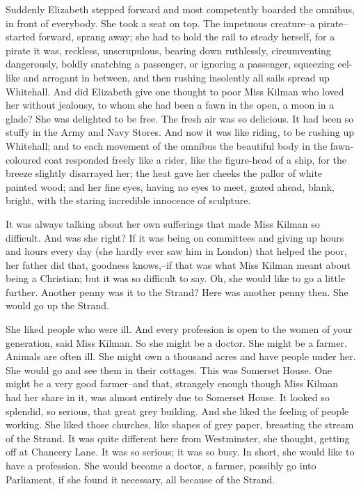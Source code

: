 \documentclass[lang=cn,10pt]{elegantbook}
\begin{document}
Suddenly Elizabeth stepped forward and most competently boarded the
omnibus, in front of everybody.  She took a seat on top.  The
impetuous creature--a pirate--started forward, sprang away; she had
to hold the rail to steady herself, for a pirate it was, reckless,
unscrupulous, bearing down ruthlessly, circumventing dangerously,
boldly snatching a passenger, or ignoring a passenger, squeezing
eel-like and arrogant in between, and then rushing insolently all
sails spread up Whitehall.  And did Elizabeth give one thought to
poor Miss Kilman who loved her without jealousy, to whom she had
been a fawn in the open, a moon in a glade?  She was delighted to
be free.  The fresh air was so delicious.  It had been so stuffy in
the Army and Navy Stores.  And now it was like riding, to be
rushing up Whitehall; and to each movement of the omnibus the
beautiful body in the fawn-coloured coat responded freely like a
rider, like the figure-head of a ship, for the breeze slightly
disarrayed her; the heat gave her cheeks the pallor of white
painted wood; and her fine eyes, having no eyes to meet, gazed
ahead, blank, bright, with the staring incredible innocence of
sculpture.

It was always talking about her own sufferings that made Miss
Kilman so difficult.  And was she right?  If it was being on
committees and giving up hours and hours every day (she hardly ever
saw him in London) that helped the poor, her father did that,
goodness knows,--if that was what Miss Kilman meant about being a
Christian; but it was so difficult to say.  Oh, she would like to
go a little further.  Another penny was it to the Strand?  Here was
another penny then.  She would go up the Strand.

She liked people who were ill.  And every profession is open to the
women of your generation, said Miss Kilman.  So she might be a
doctor.  She might be a farmer.  Animals are often ill.  She might
own a thousand acres and have people under her.  She would go and
see them in their cottages.  This was Somerset House.  One might be
a very good farmer--and that, strangely enough though Miss Kilman
had her share in it, was almost entirely due to Somerset House.  It
looked so splendid, so serious, that great grey building.  And she
liked the feeling of people working.  She liked those churches,
like shapes of grey paper, breasting the stream of the Strand.  It
was quite different here from Westminster, she thought, getting off
at Chancery Lane.  It was so serious; it was so busy.  In short,
she would like to have a profession.  She would become a doctor, a
farmer, possibly go into Parliament, if she found it necessary, all
because of the Strand.
\end{document}
